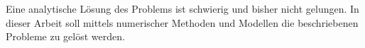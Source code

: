 Eine analytische Lösung des Problems ist schwierig und bisher nicht gelungen. In dieser Arbeit soll mittels numerischer Methoden und Modellen die beschriebenen Probleme zu gelöst werden.

%
%
